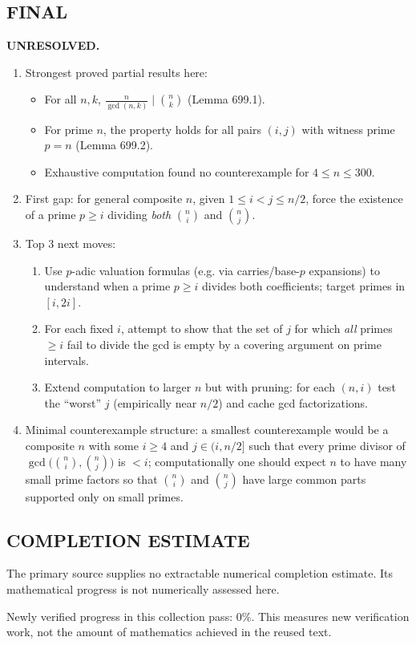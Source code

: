 \subsection*{FINAL}
\textbf{UNRESOLVED.}
\begin{enumerate}
\item[(i)] Strongest proved partial results here:
  \begin{itemize}
  \item For all $n,k$, $\frac{n}{\gcd(n,k)}\mid \binom{n}{k}$ (Lemma 699.1).
  \item For prime $n$, the property holds for all pairs $(i,j)$ with witness prime $p=n$ (Lemma 699.2).
  \item Exhaustive computation found no counterexample for $4\le n\le 300$.
  \end{itemize}
\item[(ii)] First gap: for general composite $n$, given $1\le i<j\le n/2$, force the existence of a prime $p\ge i$ dividing \emph{both} $\binom{n}{i}$ and $\binom{n}{j}$.
\item[(iii)] Top 3 next moves:
  \begin{enumerate}
  \item Use $p$-adic valuation formulas (e.g. via carries/base-$p$ expansions) to understand when a prime $p\ge i$ divides both coefficients; target primes in $[i,2i]$.
  \item For each fixed $i$, attempt to show that the set of $j$ for which \emph{all} primes $\ge i$ fail to divide the gcd is empty by a covering argument on prime intervals.
  \item Extend computation to larger $n$ but with pruning: for each $(n,i)$ test the ``worst'' $j$ (empirically near $n/2$) and cache gcd factorizations.
  \end{enumerate}
\item[(iv)] Minimal counterexample structure: a smallest counterexample would be a composite $n$ with some $i\ge 4$ and $j\in(i,n/2]$ such that every prime divisor of $\gcd\bigl(\binom{n}{i},\binom{n}{j}\bigr)$ is $<i$; computationally one should expect $n$ to have many small prime factors so that $\binom{n}{i}$ and $\binom{n}{j}$ have large common parts supported only on small primes.
\end{enumerate}




\subsection*{COMPLETION ESTIMATE}
The primary source supplies no extractable numerical completion estimate. Its mathematical progress is not numerically assessed here.

Newly verified progress in this collection pass: $0\%$. This measures new verification work, not the amount of mathematics achieved in the reused text.
